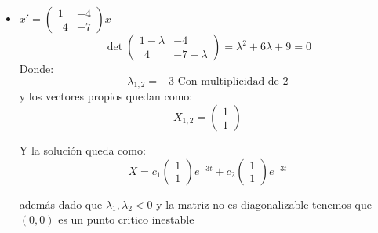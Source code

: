 \begin{itemize}
        y la soluci\'on queda como:
        
        $$X=c_1\left[ \begin{pmatrix}2-i\\ 1\end{pmatrix}\cos(t)-\begin{pmatrix}2+i\\ 1\end{pmatrix}\sin(t) \right]e^{t}+
        c_2\left[ \begin{pmatrix}2+i\\ 1\end{pmatrix}\sin(t)+\begin{pmatrix}2-i\\ 1\end{pmatrix}\cos(t) \right]e^{t}$$
        
        As\'i tenemos que como la parte real es mayor que $0$ tenemos que el punto $(0,0)$ es un punto critico inestable
        
        
    \item $x'=\begin{pmatrix}1&-4\\ \:\:4&-7\end{pmatrix}x$
     $$\det \begin{pmatrix}1-\lambda&-4\\ \:\:4&-7-\lambda\end{pmatrix}=\lambda^2+6\lambda+9=0$$
     Donde:
     $$\lambda_{1,2}=-3 \mbox{ Con multiplicidad de 2}$$
     y los vectores propios quedan como:
     $$X_{1,2}=\begin{pmatrix}1\\ 1\end{pmatrix}$$
     
     Y la soluci\'on queda como:
     $$X=c_1\begin{pmatrix}1\\ 1\end{pmatrix}e^{-3t}+c_2\begin{pmatrix}1\\ 1\end{pmatrix}e^{-3t}$$
     
     adem\'as dado que $\lambda_1,\lambda_2<0$ y la matriz no es diagonalizable tenemos que $(0,0)$ es un punto critico inestable
     
     
\end{itemize}